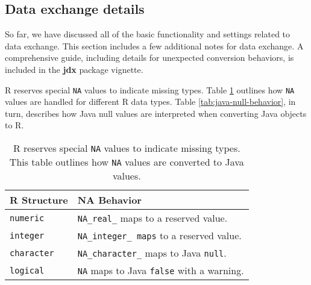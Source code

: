 \documentclass[
article,
11pt, %
a4paper, %
oneside, %
headinclude,footinclude, %
]{scrartcl}
\theoremstyle{definition} %
\theoremstyle{plain} %
\theoremstyle{remark} %
\newcommand{\pkg}[1]{\textbf{#1}}
\newcommand{\code}[1]{\texttt{#1}}
\begin{document}
\hypertarget{data-exchange-details}{}
\subsection{Data exchange details}

So far, we have discussed all of the basic functionality and settings related to data exchange. This section includes a few additional notes for data exchange. A comprehensive guide, including details for unexpected conversion behaviors, is included in the \pkg{jdx} package vignette.

R reserves special \code{NA} values to indicate missing types. Table \ref{tab:r-na-behavior} outlines how \code{NA} values are handled for different R data types. Table \ref{tab:java-null-behavior}, in turn, describes how Java null values are interpreted when converting Java objects to R.

\begin{table}[b]
\centering
\begin{tabular}{@{}ll@{}}
\toprule
R Structure      & NA Behavior                                         \\ \midrule
\code{numeric}   & \code{NA\_real\_} maps to a reserved value.           \\[.25cm]
\code{integer}   & \code{NA\_integer\_ maps} to a reserved value.        \\[.25cm]
\code{character} & \code{NA\_character\_} maps to Java \code{null}.      \\[.25cm]
\code{logical}   & \code{NA} maps to Java \code{false} with a warning. \\ \bottomrule
\end{tabular}
\caption{R reserves special \code{NA} values to indicate missing types. This table outlines how \code{NA} values are converted to Java values.}
\label{tab:r-na-behavior}
\end{table}
\end{document}
